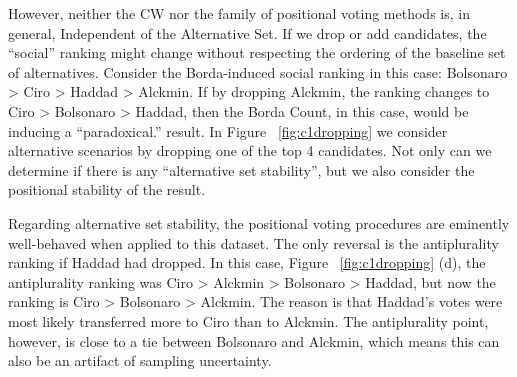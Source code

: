 \documentclass[hidelinks,11pt]{article}
\begin{document}


However, neither the CW nor the family of positional voting methods is, in
general, Independent of the Alternative Set\parencite{kaminski2015empirical}.
If we drop or add candidates, the ``social'' ranking might change
without respecting the ordering of the baseline set of alternatives. Consider
the Borda-induced social ranking in this case: Bolsonaro > Ciro > Haddad >
Alckmin. If by dropping Alckmin, the ranking changes to Ciro > Bolsonaro >
Haddad, then the Borda Count, in this case, would be inducing a ``paradoxical.''
result. In Figure ~\ref{fig:c1dropping} we consider alternative scenarios by
dropping one of the top 4 candidates. Not only can we determine if there is any ``alternative set stability'', but we also consider the positional stability of the result.

Regarding alternative set stability, the positional voting
procedures are eminently well-behaved when applied to this dataset. The only reversal is the
antiplurality ranking if Haddad had dropped. In this case, Figure
~\ref{fig:c1dropping} (d), the antiplurality ranking was  Ciro > Alckmin >
Bolsonaro > Haddad, but now the ranking is Ciro > Bolsonaro > Alckmin. The
reason is that Haddad's votes were most likely transferred more to Ciro
than to Alckmin. The antiplurality point, however, is close to a tie
between Bolsonaro and Alckmin, which means this can also be an artifact
of sampling uncertainty.
\end{document}

